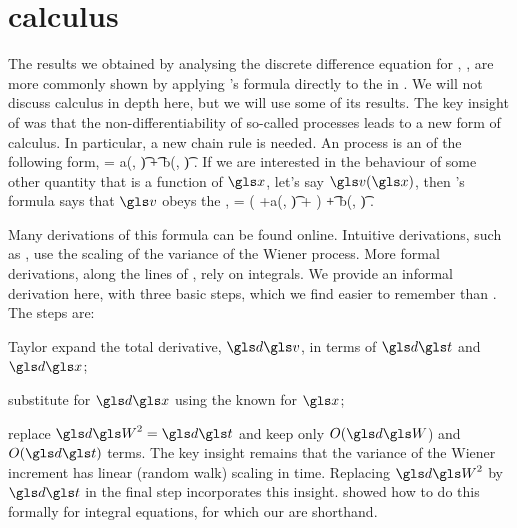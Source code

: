 
\section{\Ito calculus}
The results we obtained by analysing the discrete difference equation for \GBM, , are more commonly shown by applying \Ito's formula directly to the \SDE in . We will not discuss \Ito calculus in depth here, but we will use some of its results. The key insight of \Ito was that the non-differentiability of so-called \Ito processes leads to a new form of calculus. In particular, a new chain rule is needed. An \Ito process is an \SDE of the following form,
\be
\gd\x = a(\x, \t) \gd\t + b(\x, \t) \gd\gW.
\ee
If we are interested in the behaviour of some other quantity that is a function of $\x$, let's say $\gv(\x)$, then \Ito's formula says that $\gv$ obeys the \SDE,
\be
\gd\gv =  \left(\frac{\partial \gv}{\partial\t} +a(\x, \t)\frac{\partial \gv}{\partial\x} +  \right) \gd\t + b(\x, \t) \frac{\partial \gv}{\partial\x} \gd\gW.
\ee

Many derivations of this formula can be found online. Intuitive derivations, such as \cite{Hull2006}, use the scaling of the variance of the Wiener process. More formal derivations, along the lines of \cite{Harrison2013}, rely on integrals. We provide an informal derivation here, with three basic steps, which we find easier to remember than . The steps are:
\bi
\item Taylor expand the total derivative, $\gd\gv$, in terms of $\gd\t$ and $\gd\x$;
\item substitute for $\gd\x$ using the known \SDE for $\x$;
\item replace $\gd\gW^2=\gd\t$ and keep only $O(\gd\gW$) and $O(\gd\t)$ terms.
\ei
The key insight remains that the variance of the Wiener increment has linear (\ie random walk) scaling in time. Replacing $\gd\gW^2$ by $\gd\t$ in the final step incorporates this insight. \Ito showed how to do this formally for integral equations, for which our \SDEs are shorthand.

